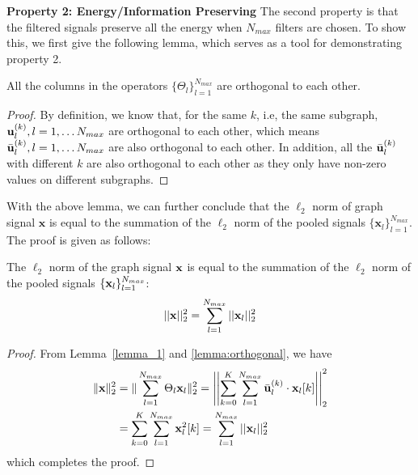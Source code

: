 \documentclass[sigconf]{acmart}
\begin{document}
\vspace{0.5em}
\noindent{}\textbf{Property 2: Energy/Information Preserving} The second property is that the filtered signals preserve all the energy when $N_{max}$ filters are chosen. To show this, we first give the following lemma, which serves as a tool for demonstrating property 2.
\begin{lemma} \label{lemma:orthogonal}
All the columns in the operators $\{ \Theta_l\}_{l=1}^{N_{max}}$ are orthogonal to each other.
\end{lemma}
\vspace{-1em}
\begin{proof}
    By definition, we know that, for the same $k$, i.e, the same subgraph, ${\bf u}^{(k)}_l, l=1,\dots N_{max}$ are orthogonal to each other, which means $\bar{\bf u}^{(k)}_l, l=1,\dots N_{max}$ are also orthogonal to each other. In addition, all the $\bar{\bf u}^{(k)}_l$ with different $k$ are also orthogonal to each other as they only have non-zero values on different subgraphs. 
\end{proof}

With the above lemma, we can further conclude that the $\ell_2$ norm of graph signal $\mathbf{x}$ is equal to the summation of the $\ell_2$ norm of the pooled signals $\{\mathbf{x}_l\}_{l=1}^{N_{max}}$. The proof is given as follows:
\begin{lemma} \label{lemma:l_2 norm}
The $\ell_2$ norm of the graph signal ${\bf x}$ is equal to the summation of the $\ell_2$ norm of the pooled signals $\{{\bf x}_l\}_{l=1}^{N_{max}}$:
\begin{align}
  ||{\bf x}||_2^2  = \sum\limits_{l=1}^{N_{max}} ||{\bf x}_l||^2_2
\end{align}
\end{lemma}\label{lem:reconstruction}
\vspace{-1em}
\begin{proof}
From Lemma~\ref{lemma_1} and \ref{lemma:orthogonal}, we have
\begin{align}
\|{\bf x}\|_2^2 &=  \| \sum\limits_{l=1}^{N_{max}} \Theta_l {\bf x}_l \|_2^2  = \left|\left|\sum\limits_{k=0}^K \sum\limits_{l=1}^{N_{max}}  \bar{\bf u}^{(k)}_l \cdot {\bf x}_l[k]\right|\right|^2_2 \nonumber \\
 & = \sum\limits_{k=0}^K \sum\limits_{l=1}^{N_{max}} {\bf x}_l^2[k] = \sum\limits_{l=1}^{N_{max}} ||{\bf x}_l||^2_2 \nonumber
\end{align}
which completes the proof.
\end{proof}
\end{document}
